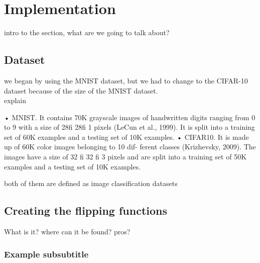 \section{Implementation} \label{sec:implementation}
intro to the section, what are we going to talk about?

\subsection{Dataset}
we began by using the MNIST dataset, but we had to change to the CIFAR-10 dataset because of the size of the MNIST dataset.\\
explain

• MNIST. It contains 70K grayscale images of handwritten digits ranging from 0 to 9 with a size of 28fi 28fi 1 pixels (LeCun et al., 1999). It is split into a training set of 60K examples and a testing set of 10K examples.
• CIFAR10. It is made up of 60K color images belonging to 10 dif- ferent classes (Krizhevsky, 2009). The images have a size of 32 fi 32 fi 3 pixels and are split into a training set of 50K examples and a testing set of 10K examples.

both of them are defined as image classification datasets


\subsection{Creating the flipping functions}
What is it? where can it be found? pros?



\subsubsection{Example subsubtitle}

\newpage
